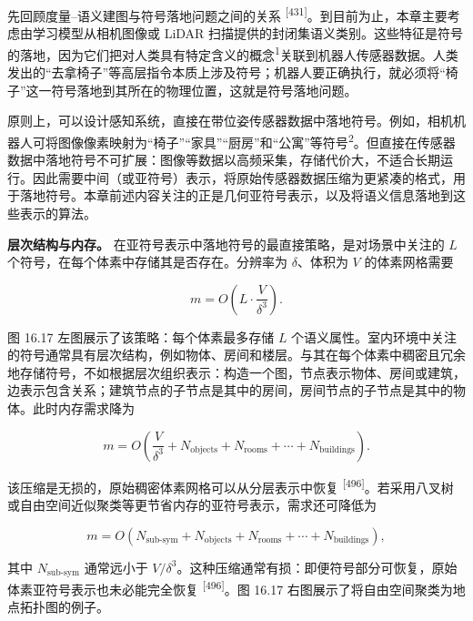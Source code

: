 先回顾度量--语义建图与符号落地问题之间的关系 \textsuperscript{[431]}。到目前为止，本章主要考虑由学习模型从相机图像或 LiDAR 扫描提供的封闭集语义类别。这些特征是符号的落地，因为它们把对人类具有特定含义的概念\textsuperscript{1}关联到机器人传感器数据。人类发出的“去拿椅子”等高层指令本质上涉及符号；机器人要正确执行，就必须将“椅子”这一符号落地到其所在的物理位置，这就是符号落地问题。

原则上，可以设计感知系统，直接在带位姿传感器数据中落地符号。例如，相机机器人可将图像像素映射为“椅子”“家具”“厨房”和“公寓”等符号\textsuperscript{2}。但直接在传感器数据中落地符号不可扩展：图像等数据以高频采集，存储代价大，不适合长期运行。因此需要中间（或亚符号）表示，将原始传感器数据压缩为更紧凑的格式，用于落地符号。本章前述内容关注的正是几何亚符号表示，以及将语义信息落地到这些表示的算法。

\textbf{层次结构与内存。} 在亚符号表示中落地符号的最直接策略，是对场景中关注的 $L$ 个符号，在每个体素中存储其是否存在。分辨率为 $\delta$、体积为 $V$ 的体素网格需要

\begin{equation}
m=O\left(L\cdot\frac{V}{\delta^3}\right).\tag{16.34}
\end{equation}

图 16.17 左图展示了该策略：每个体素最多存储 $L$ 个语义属性。室内环境中关注的符号通常具有层次结构，例如物体、房间和楼层。与其在每个体素中稠密且冗余地存储符号，不如根据层次组织表示：构造一个图，节点表示物体、房间或建筑，边表示包含关系；建筑节点的子节点是其中的房间，房间节点的子节点是其中的物体。此时内存需求降为

\begin{equation}
m=O\left(\frac{V}{\delta^3}+N_{\mathrm{objects}}+N_{\mathrm{rooms}}+\cdots+N_{\mathrm{buildings}}\right).\tag{16.35}
\end{equation}

该压缩是无损的，原始稠密体素网格可以从分层表示中恢复 \textsuperscript{[496]}。若采用八叉树或自由空间近似聚类等更节省内存的亚符号表示，需求还可降低为

\begin{equation}
m=O\left(N_{\mathrm{sub\text{-}sym}}+N_{\mathrm{objects}}+N_{\mathrm{rooms}}+\cdots+N_{\mathrm{buildings}}\right),\tag{16.36}
\end{equation}

其中 $N_{\mathrm{sub\text{-}sym}}$ 通常远小于 $V/\delta^3$。这种压缩通常有损：即便符号部分可恢复，原始体素亚符号表示也未必能完全恢复 \textsuperscript{[496]}。图 16.17 右图展示了将自由空间聚类为地点拓扑图的例子。

